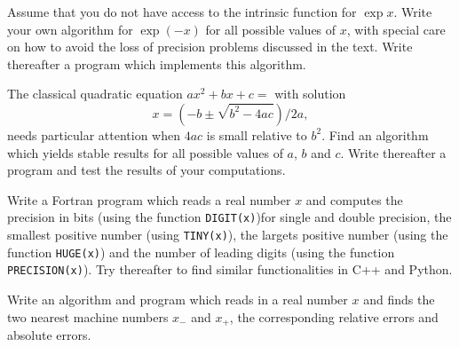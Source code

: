 \begin{prob}
Assume that you do not have access to the intrinsic function for $\exp{x}$. Write your own
algorithm for $\exp{(-x)}$  for all possible values of $x$, with special care on how to 
avoid the loss of precision problems
discussed in the text.  Write thereafter a program which implements this algorithm.
\end{prob}


\begin{prob}
The classical quadratic equation $ax^2+bx+c=$ with solution
\[
      x = \left(-b\pm \sqrt{b^2-4ac}\right)/2a,
\]
needs particular attention when $4ac$ is small relative to $b^2$. Find an algorithm which 
yields stable results for all possible values of $a$, $b$ and $c$. Write thereafter a program and 
test the results of your computations.
\end{prob}


\begin{prob}
Write a Fortran program which reads a real number $x$ and computes the precision in bits (using the function
\lstinline{DIGIT(x)})for single and double precision, the smallest positive number
(using \lstinline{TINY(x)}), the largets positive number (using the function \lstinline{HUGE(x)})
and the number of leading digits (using the function \lstinline{PRECISION(x)}).  
Try thereafter to find similar functionalities in C++ and Python.
\end{prob}


\begin{prob}
Write an algorithm and program which reads in a real number $x$ and finds the two nearest machine
numbers $x_{-}$ and $x_{+}$, the corresponding relative errors and absolute errors.  
\end{prob}


